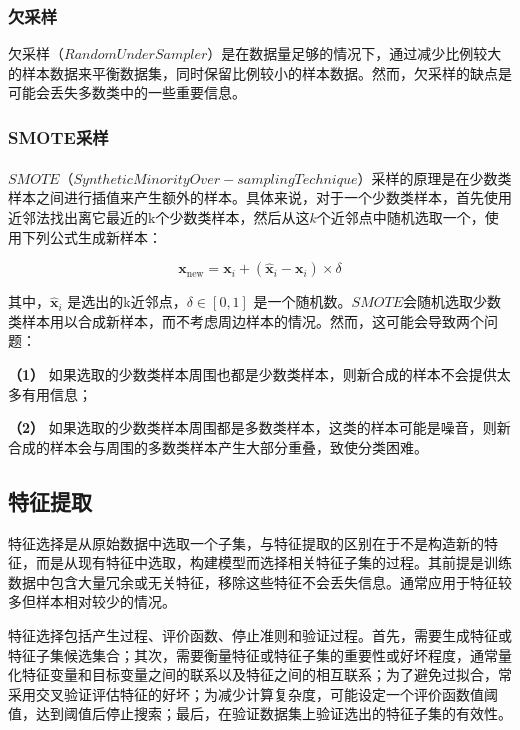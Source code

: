\documentclass[withoutpreface,bwprint]{cumcmthesis}
\begin{document}
\subsubsection{欠采样}
欠采样（\(RandomUnderSampler\)）是在数据量足够的情况下，通过减少比例较大的样本数据来平衡数据集，同时保留比例较小的样本数据。然而，欠采样的缺点是可能会丢失多数类中的一些重要信息。

\subsubsection{SMOTE采样}
\(SMOTE\)\textsuperscript{\cite{fernandez2018smote}}（\(Synthetic Minority Over-sampling Technique\)）采样的原理是在少数类样本之间进行插值来产生额外的样本。具体来说，对于一个少数类样本，首先使用近邻法找出离它最近的k个少数类样本，然后从这\(k\)个近邻点中随机选取一个，使用下列公式生成新样本：

\[ \mathbf{x}_{\text{new}} = \mathbf{x}_i + (\hat{\mathbf{x}}_i - \mathbf{x}_i) \times \delta \]

其中，\( \hat{\mathbf{x}}_i \) 是选出的k近邻点，\( \delta \in [0, 1] \) 是一个随机数。\(SMOTE\)会随机选取少数类样本用以合成新样本，而不考虑周边样本的情况。然而，这可能会导致两个问题：

\textbf{（1）} 如果选取的少数类样本周围也都是少数类样本，则新合成的样本不会提供太多有用信息；

\textbf{（2）} 如果选取的少数类样本周围都是多数类样本，这类的样本可能是噪音，则新合成的样本会与周围的多数类样本产生大部分重叠，致使分类困难。



\subsection{特征提取}


特征选择是从原始数据中选取一个子集，与特征提取的区别在于不是构造新的特征，而是从现有特征中选取，构建模型而选择相关特征子集的过程。其前提是训练数据中包含大量冗余或无关特征，移除这些特征不会丢失信息。通常应用于特征较多但样本相对较少的情况。

特征选择包括产生过程、评价函数、停止准则和验证过程。首先，需要生成特征或特征子集候选集合；其次，需要衡量特征或特征子集的重要性或好坏程度，通常量化特征变量和目标变量之间的联系以及特征之间的相互联系；为了避免过拟合，常采用交叉验证评估特征的好坏；为减少计算复杂度，可能设定一个评价函数值阈值，达到阈值后停止搜索；最后，在验证数据集上验证选出的特征子集的有效性。
\end{document}
